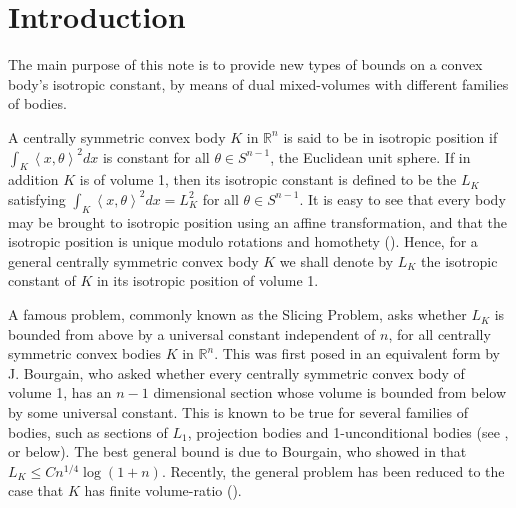 \documentclass[12pt,oneside]{amsart}
\theoremstyle{definition}
\theoremstyle{remark}
\theoremstyle{proof}
\numberwithin{equation}{section}
\newcommand{\set}[1]{\left\{#1\right\}}
\newcommand{\scalar}[1]{\left \langle #1 \right \rangle}
\newcommand{\Real}{\mathbb{R}}
\begin{document}


\maketitle



\section{Introduction}

The main purpose of this note is to provide new types of bounds on
a convex body's isotropic constant, by means of dual mixed-volumes
with different families of bodies.

A centrally symmetric convex body $K$ in $\Real^n$ is said to be
in isotropic position if $\int_K \scalar{x,\theta}^2 dx$ is
constant for all $\theta \in S^{n-1}$, the Euclidean unit sphere.
If in addition $K$ is of volume 1, then its isotropic constant is
defined to be the $L_K$ satisfying $\int_K \scalar{x,\theta}^2 dx
= L_K^2$ for all $\theta \in S^{n-1}$.
It is easy to see that every body may be brought to isotropic
position using an affine transformation, and that the isotropic
position is unique modulo rotations and homothety
(\cite{Milman-Pajor-LK}). Hence, for a general centrally
symmetric convex body $K$ we shall denote by $L_K$ the isotropic
constant of $K$ in its isotropic position of volume 1.

A famous problem, commonly known as the Slicing Problem, asks
whether $L_K$ is bounded from above by a universal constant
independent of $n$, for all centrally symmetric convex bodies $K$
in $\Real^n$. This was first posed in an equivalent form by J.
Bourgain, who asked whether every centrally symmetric convex body
of volume 1, has an $n-1$ dimensional section whose volume is
bounded from below by some universal constant. This is known to
be true for several families of bodies, such as sections of $L_1$,
projection bodies and 1-unconditional bodies (see
\cite{Milman-Pajor-LK},\cite{Ball-weak-GL} or below). The best
general bound is due to Bourgain, who showed in \cite{Bourgain-LK}
that $L_K \leq C n^{1/4} \log(1+n)$. Recently, the general
problem has been reduced to the case that $K$ has finite
volume-ratio (\cite{BKM-symmetrizations}).
\end{document}
